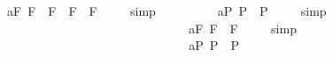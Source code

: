 \begin{isabellebody}
\ a{}{}{\isacharunderscore}{}{\isacharunderscore}F{\isacharcolon}\ {\isachardoublequoteopen}{\isacharbrackleft}{\isacharparenleft}\isactrlbold {\isasymbox}{\isacharparenleft}{\isasymphi}\isactrlsup F\ \isactrlbold {\isasymrightarrow}\ {\isasymphi}\isactrlsup F{\isacharparenright}{\isacharparenright}\ \isactrlbold {\isasymrightarrow}\ {\isacharparenleft}\isactrlbold {\isasymbox}{\isasymphi}\isactrlsup F\ \isactrlbold {\isasymrightarrow}\ \isactrlbold {\isasymbox}{\isasymphi}\isactrlsup F{\isacharparenright}{\isacharbrackright}\ {\isacharequal}\ {\isasymtop}{\isachardoublequoteclose}%
\isadelimproof
\ %
\endisadelimproof
%
\isatagproof
{}\isamarkupfalse%
\ simp\ \isamarkupfalse%
%
\endisatagproof
{\isafoldproof}%
%
\isadelimproof
%
\endisadelimproof
\ \ \ \ \ \isanewline
\ \isamarkupfalse%
\ a{}{}{\isacharunderscore}{}{\isacharunderscore}P{\isacharcolon}\ {\isachardoublequoteopen}{\isacharbrackleft}\isactrlbold {\isasymbox}{\isasymphi}\isactrlsup P\ \isactrlbold {\isasymrightarrow}\ {\isasymphi}\isactrlsup P{\isacharbrackright}\ {\isacharequal}\ {\isasymtop}{\isachardoublequoteclose}%
\isadelimproof
\ %
\endisadelimproof
%
\isatagproof
{}\isamarkupfalse%
\ simp\ \isamarkupfalse%
%
\endisatagproof
{\isafoldproof}%
%
\isadelimproof
%
\endisadelimproof
\ \ \ \ \ \ \ \ \ \ \ \ \ \ \ \ \ \ \ \ \ \ \ \ \ \ \ \isanewline
\ \isamarkupfalse%
\ a{}{}{\isacharunderscore}{}{\isacharunderscore}F{\isacharcolon}\ {\isachardoublequoteopen}{\isacharbrackleft}\isactrlbold {\isasymbox}{\isasymphi}\isactrlsup F\ \isactrlbold {\isasymrightarrow}\ {\isasymphi}\isactrlsup F{\isacharbrackright}\ {\isacharequal}\ {\isasymtop}{\isachardoublequoteclose}%
\isadelimproof
\ %
\endisadelimproof
%
\isatagproof
{}\isamarkupfalse%
\ simp\ \isamarkupfalse%
%
\endisatagproof
{\isafoldproof}%
%
\isadelimproof
%
\endisadelimproof
\ \ \ \ \ \ \ \ \ \ \ \ \ \ \ \ \ \ \ \ \ \ \ \ \ \ \ \isanewline
\isanewline
\ \isamarkupfalse%
\ a{}{}{\isacharunderscore}{}{\isacharunderscore}P{\isacharcolon}\ {\isachardoublequoteopen}{\isacharbrackleft}\isactrlbold {\isasymbox}\isactrlbold {\isasymdiamond}{\isasymphi}\isactrlsup P\ \isactrlbold {\isasymrightarrow}\ \isactrlbold {\isasymdiamond}{\isasymphi}\isactrlsup P{\isacharbrackright}\ {\isacharequal}\ {\isasymtop}{\isachardoublequoteclose}%
\isadelimproof
\ %
\endisadelimproof

\end{isabellebody}
